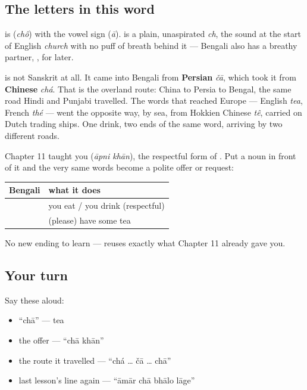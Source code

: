 \subsection*{The letters in this word}
\textbf{} is \textbf{} (\emph{chô}) with the vowel sign \textbf{} (\emph{ā}). \textbf{} is a plain, unaspirated \emph{ch}, the sound at the start of English \emph{church} with no puff of breath behind it — Bengali also has a breathy partner, \textbf{}, for later.

\begin{cousinweb}
\textbf{} is not Sanskrit at all. It came into Bengali from \textbf{Persian} \emph{čā}, which took it from \textbf{Chinese} \emph{chá}. That is the overland route: China to Persia to Bengal, the same road Hindi and Punjabi travelled. The words that reached Europe — English \emph{tea}, French \emph{thé} — went the opposite way, by sea, from Hokkien Chinese \emph{tê}, carried on Dutch trading ships. One drink, two ends of the same word, arriving by two different roads.
\end{cousinweb}

\begin{grammarlens}[title={Grammar Lens: an offer, built on a form you already have}]
Chapter 11 taught you \textbf{ } (\emph{āpni khān}), the respectful form of . Put a noun in front of it and the very same words become a polite offer or request:

\noindent
\begin{tabularx}{\linewidth}{@{}>{\raggedright\arraybackslash}X>{\raggedright\arraybackslash}X@{}}
\toprule
\textbf{Bengali} & \textbf{what it does} \\
\midrule
\bn{আপনি} \bn{খান} & you eat / you drink (respectful) \\
\textbf{\bn{চা} \bn{খান}} & (please) have some tea \\
\bottomrule
\end{tabularx}

No new ending to learn —   reuses exactly what Chapter 11 already gave you.
\end{grammarlens}

\subsection*{Your turn}
Say these aloud:

\begin{itemize}
\raggedright
  \item \textquotedblleft{}chā\textquotedblright{} — tea
  \item the offer — \textquotedblleft{}chā khān\textquotedblright{}
  \item the route it travelled — \textquotedblleft{}chá … čā … chā\textquotedblright{}
  \item last lesson's line again — \textquotedblleft{}āmār chā bhālo lāge\textquotedblright{}
\end{itemize}

